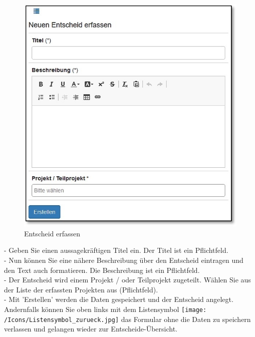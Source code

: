 \begin{figure}   %
  \vspace{-35pt}      %
  \begin{center}
    \includegraphics[width=1\linewidth]{../chapters/05_Sitzungswesen/pictures//5-5_EntscheidErfassen.jpg}
  \end{center}
  \caption{Entscheid erfassen}
\end{figure}
- Geben Sie einen aussagekräftigen Titel ein. Der Titel ist ein Pflichtfeld.\\
- Nun können Sie eine nähere Beschreibung über den Entscheid eintragen und den Text auch formatieren. Die Beschreibung ist ein Pflichtfeld.\\
- Der Entscheid wird einem Projekt / oder Teilprojekt zugeteilt. Wählen Sie aus der Liste der erfassten Projekten aus (Pflichtfeld).\\
- Mit 'Erstellen' werden die Daten gespeichert und der Entscheid angelegt. Andernfalls können Sie oben links mit dem Listensymbol \texttt{[image: /Icons/Listensymbol\_zurueck.jpg]} das Formular ohne die Daten zu speichern verlassen und gelangen wieder zur Entscheide-Übersicht.\\

